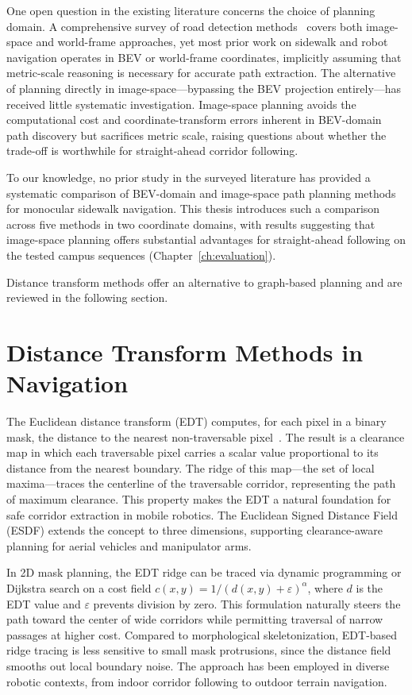 \documentclass[12pt,letterpaper,oneside]{report}
\begin{document}
One open question in the existing literature concerns the choice of planning domain. A comprehensive survey of road detection methods~\cite{hillel2014road} covers both image-space and world-frame approaches, yet most prior work on sidewalk and robot navigation operates in BEV or world-frame coordinates, implicitly assuming that metric-scale reasoning is necessary for accurate path extraction. The alternative of planning directly in image-space---bypassing the BEV projection entirely---has received little systematic investigation. Image-space planning avoids the computational cost and coordinate-transform errors inherent in BEV-domain path discovery but sacrifices metric scale, raising questions about whether the trade-off is worthwhile for straight-ahead corridor following.

To our knowledge, no prior study in the surveyed literature has provided a systematic comparison of BEV-domain and image-space path planning methods for monocular sidewalk navigation. This thesis introduces such a comparison across five methods in two coordinate domains, with results suggesting that image-space planning offers substantial advantages for straight-ahead following on the tested campus sequences (Chapter~\ref{ch:evaluation}).

Distance transform methods offer an alternative to graph-based planning and are reviewed in the following section.


\section{Distance Transform Methods in Navigation}

The Euclidean distance transform (EDT) computes, for each pixel in a binary mask, the distance to the nearest non-traversable pixel~\cite{felzenszwalb_dt}. The result is a clearance map in which each traversable pixel carries a scalar value proportional to its distance from the nearest boundary. The ridge of this map---the set of local maxima---traces the centerline of the traversable corridor, representing the path of maximum clearance. This property makes the EDT a natural foundation for safe corridor extraction in mobile robotics. The Euclidean Signed Distance Field (ESDF) extends the concept to three dimensions, supporting clearance-aware planning for aerial vehicles and manipulator arms.

In 2D mask planning, the EDT ridge can be traced via dynamic programming or Dijkstra search on a cost field $c(x,y) = 1/(d(x,y) + \varepsilon)^\alpha$, where $d$ is the EDT value and $\varepsilon$ prevents division by zero. This formulation naturally steers the path toward the center of wide corridors while permitting traversal of narrow passages at higher cost. Compared to morphological skeletonization, EDT-based ridge tracing is less sensitive to small mask protrusions, since the distance field smooths out local boundary noise. The approach has been employed in diverse robotic contexts, from indoor corridor following to outdoor terrain navigation.
\end{document}
